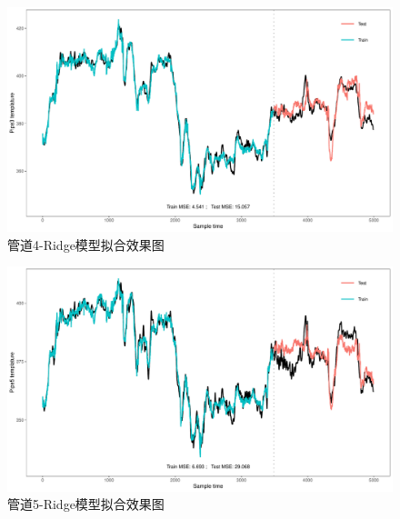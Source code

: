 \documentclass[
]{article}
\begin{document}
\begin{figure}

{\centering \includegraphics{TJRJCP_DuXingx_202105_files/figure-latex/unnamed-chunk-32-1} 

}

\caption{管道4-Ridge模型拟合效果图}\label{fig:unnamed-chunk-32}
\end{figure}

\begin{figure}

{\centering \includegraphics{TJRJCP_DuXingx_202105_files/figure-latex/unnamed-chunk-33-1} 

}

\caption{管道5-Ridge模型拟合效果图}\label{fig:unnamed-chunk-33}
\end{figure}
\end{document}

